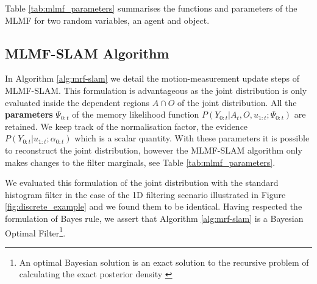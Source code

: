 Table \ref{tab:mlmf_parameters} summarises the functions and parameters of the MLMF for two random variables, an agent and object.
\begin{table}[h]
\centering
{}
\caption{MLMF functions with associated parameters. The marginal parameters are the discretisation of the 
state space $\boldsymbol{\theta} \in \mathbb{R}^N$, $\boldsymbol{\theta}^{(s)}$ corresponds to the probability being in state $s$.}
\label{tab:mlmf_parameters}
\end{table}
\FloatBarrier
\subsection{MLMF-SLAM Algorithm}

In Algorithm \ref{alg:mrf-slam} we detail the motion-measurement update steps of MLMF-SLAM.
This formulation is advantageous as the joint distribution is only evaluated inside the dependent regions 
$A\cap O$ of the joint distribution. All the \textbf{parameters} $\Psi_{0:t}$ of the memory likelihood function
$P(Y_{0:t}|A_t,O,u_{1:t};\Psi_{0:t})$ are retained. We keep track of the normalisation factor, the evidence 
$P(Y_{0:t}|u_{1:t};\alpha_{0:t})$ which is a scalar quantity. 
With these parameters it is possible to reconstruct the joint distribution, however the MLMF-SLAM algorithm only
makes changes to the filter marginals, see Table \ref{tab:mlmf_parameters}. 

We evaluated this formulation of the joint distribution with the standard histogram filter in the case of the 1D filtering scenario
illustrated in Figure \ref{fig:discrete_example} and we found them to be identical. Having respected the formulation of Bayes rule, we
assert that Algorithm \ref{alg:mrf-slam} is a Bayesian Optimal Filter\footnote{An optimal Bayesian solution is an exact solution to the recursive problem of calculating the exact posterior density 
\cite{PF_tutorial_2002}}.


